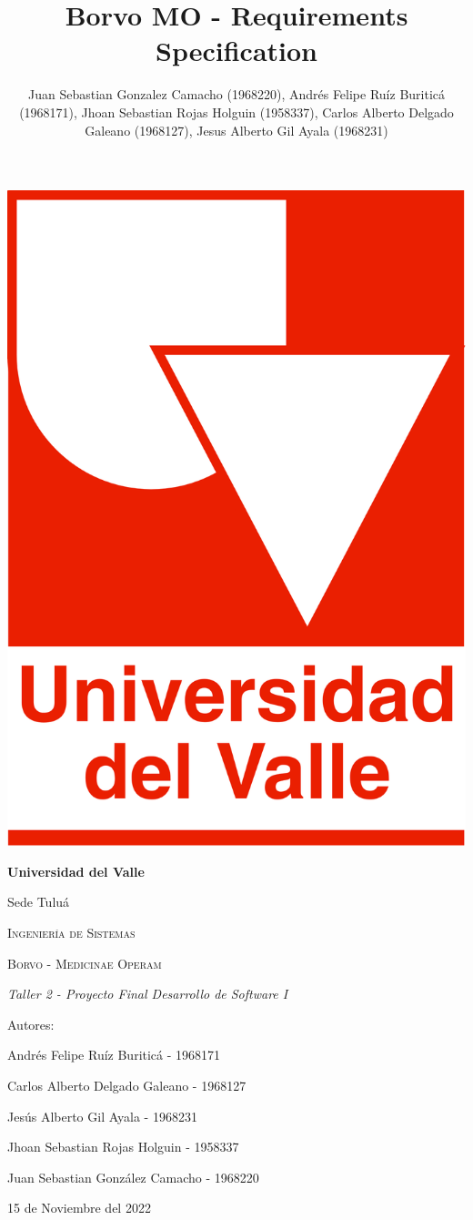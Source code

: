 \documentclass[12pt,a4paper]{article}
\author{Juan Sebastian Gonzalez Camacho (1968220), Andrés Felipe Ruíz Buriticá (1968171), Jhoan Sebastian Rojas Holguin (1958337), Carlos Alberto Delgado Galeano (1968127), Jesus Alberto Gil Ayala (1968231)}
\title{Borvo MO - Requirements Specification}
\begin{document}
\begin{titlepage}
\centering
{\includegraphics[width=0.18 \textwidth]{logo.png} \par}
\vfill
{\bfseries\LARGE Universidad del Valle\par}
{\Large Sede Tuluá\par}
\vfill
{\scshape\Large Ingeniería de Sistemas \par}
\vfill
{\scshape\Huge Borvo - Medicinae Operam \par}
\vfill
{\itshape\Large Taller 2 - Proyecto Final Desarrollo de Software I \par}
\vfill
{\Large Autores: \par}
{\Large Andrés Felipe Ruíz Buriticá - 1968171 \par}
{\Large Carlos Alberto Delgado Galeano - 1968127 \par}
{\Large Jesús Alberto Gil Ayala - 1968231 \par}
{\Large Jhoan Sebastian Rojas Holguin - 1958337 \par}
{\Large Juan Sebastian González Camacho - 1968220 \par}
\vfill
{\Large 15 de Noviembre del 2022 \par}
\end{titlepage}
\tableofcontents
\newpage
\end{document}
